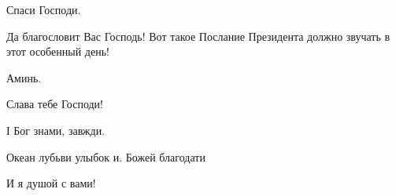\begin{itemize}
Спаси Господи.

 
Да благословит Вас Господь! Вот такое Послание Президента должно звучать в этот особенный день!

 
Аминь.

 
Слава тебе Господи!

 
І Бог знами, завжди.

 
Океан лубьви улыбок и. Божей благодати

 
И я душой с вами!

 

\end{itemize}
